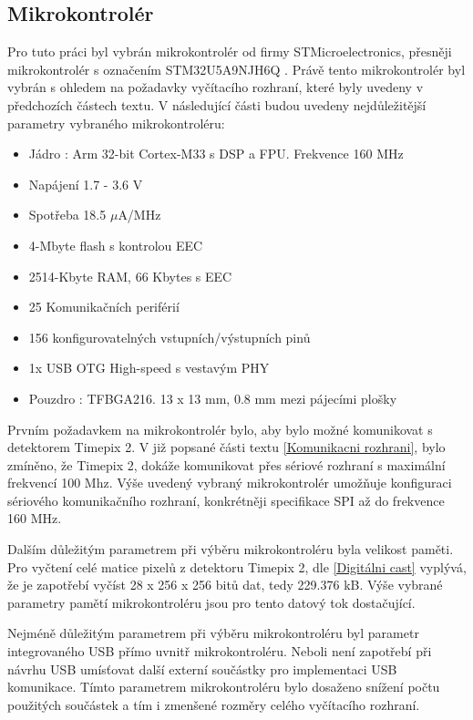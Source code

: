	\subsection{Mikrokontrolér}
	\label{mikrokontolér}
	Pro tuto práci byl vybrán mikrokontrolér od firmy STMicroelectronics, přesněji mikrokontrolér s označením STM32U5A9NJH6Q \cite{STM32U5A9}. Právě tento mikrokontrolér byl vybrán s ohledem na požadavky vyčítacího rozhraní, které byly uvedeny v předchozích částech textu. V následující části budou uvedeny nejdůležitější parametry vybraného mikrokontroléru:
	\begin{itemize}
		\setlength\itemsep{0.005em}
		\item Jádro : Arm 32-bit Cortex-M33 s DSP a FPU. Frekvence 160 MHz
		\item Napájení 1.7 - 3.6 V
		\item Spotřeba 18.5 $\mu$A/MHz
		\item 4-Mbyte flash s kontrolou EEC
		\item 2514-Kbyte RAM, 66 Kbytes s EEC
		\item 25 Komunikačních periférií
		\item 156 konfigurovatelných vstupních/výstupních pinů
		\item 1x USB OTG High-speed s vestavým PHY 
		\item Pouzdro : TFBGA216. 13 x 13 mm, 0.8 mm mezi pájecími plošky
	\end{itemize}
	\par Prvním požadavkem na mikrokontrolér bylo, aby bylo možné komunikovat s detektorem Timepix 2. V již popsané části textu \ref{Komunikacni rozhrani}, bylo zmíněno, že Timepix 2, dokáže komunikovat přes sériové rozhraní s maximální frekvencí 100 Mhz. Výše uvedený vybraný mikrokontrolér umožňuje konfiguraci sériového komunikačního rozhraní, konkrétněji specifikace SPI až do frekvence 160 MHz. 
	\par Dalším důležitým parametrem při výběru mikrokontroléru byla velikost paměti. Pro vyčtení celé matice pixelů z detektoru Timepix 2, dle \ref{Digitálni cast} vyplývá, že je zapotřebí vyčíst 28 x 256 x 256 bitů dat, tedy 229.376 kB. Výše vybrané parametry pamětí mikrokontroléru jsou pro tento datový tok dostačující.
	\par Nejméně důležitým parametrem při výběru mikrokontroléru byl parametr integrovaného USB přímo uvnitř mikrokontroléru. Neboli není zapotřebí při návrhu USB umísťovat další externí součástky pro implementaci USB komunikace. Tímto parametrem mikrokontroléru bylo dosaženo snížení počtu použitých součástek a tím i zmenšené rozměry celého vyčítacího rozhraní.
	
